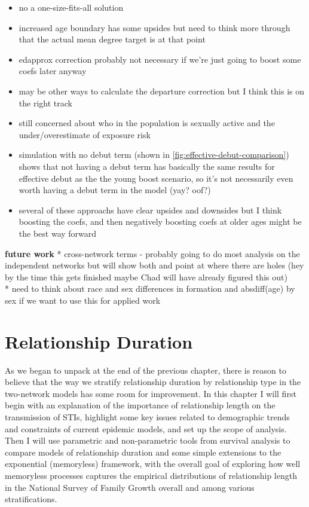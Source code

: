 \documentclass [11pt, proquest] {uwthesis}[2015/03/03]
\providecommand{\tightlist}{%
  \setlength{\itemsep}{0pt}\setlength{\parskip}{0pt}}
\begin{document}
\begin{itemize}
\tightlist
\item
  no a one-size-fits-all solution
\item
  increased age boundary has some upsides but need to think more through
  that the actual mean degree target is at that point
\item
  edapprox correction probably not necessary if we're just going to
  boost some coefs later anyway
\item
  may be other ways to calculate the departure correction but I think
  this is on the right track
\item
  still concerned about who in the population is sexually active and the
  under/overestimate of exposure risk
\item
  simulation with no debut term (shown in
  \ref{fig:effective-debut-comparison}) shows that not having a debut
  term has basically the same results for effective debut as the the
  young boost scenario, so it's not necessarily even worth having a
  debut term in the model (yay? oof?)\\
\item
  several of these approachs have clear upsides and downsides but I
  think boosting the coefs, and then negatively boosting coefs at older
  ages might be the best way forward
\end{itemize}
\textbf{future work} * cross-network terms - probably going to do most
analysis on the independent networks but will show both and point at
where there are holes (hey by the time this gets finished maybe Chad
will have already figured this out)\\
* need to think about race and sex differences in formation and
absdiff(age) by sex if we want to use this for applied work

\chapter{Relationship Duration}\label{surv}

As we began to unpack at the end of the previous chapter, there is
reason to believe that the way we stratify relationship duration by
relationship type in the two-network models has some room for
improvement. In this chapter I will first begin with an explanation of
the importance of relationship length on the transmission of STIs,
highlight some key issues related to demographic trends and constraints
of current epidemic models, and set up the scope of analysis. Then I
will use parametric and non-parametric tools from survival analysis to
compare models of relationship duration and some simple extensions to
the exponential (memoryless) framework, with the overall goal of
exploring how well memoryless processes captures the empirical
distributions of relationship length in the National Survey of Family
Growth overall and among various stratifications.
\end{document}
